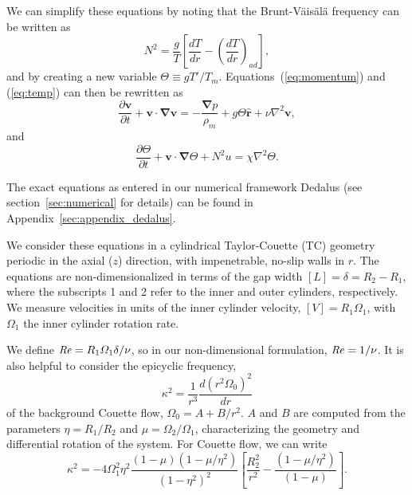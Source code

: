 \documentclass{jfm}
\begin{document}
We can simplify these equations by noting that the Brunt-V\"ais\"al\"a frequency can be written as
\begin{equation}
  \label{eq:brunt}
  N^2 = \frac{g}{T}\left[\frac{d T}{dr} - \left(\frac{d T}{dr}\right)_{ad}\right],
\end{equation}
and by creating a new variable $\Theta \equiv g T'/T_m$. Equations~(\ref{eq:momentum}) and (\ref{eq:temp}) can then be rewritten as 
\begin{equation}
  \label{eq:final_momentum}
  \frac{\partial \mathbf{v}}{\partial t} + \mathbf{v \cdot \nabla v} = -\frac{\mathbf{\nabla} p}{\rho_m} + g \Theta \mathbf{\hat{r}} + \nu \nabla^2 \mathbf{v},
\end{equation}
and
\begin{equation}
  \label{eq:final_temp}
  \frac{\partial \Theta}{\partial t} + \mathbf{v \cdot \nabla} \Theta + N^2 u = \chi \nabla^2 \Theta.
\end{equation}

The exact equations as entered in our numerical framework Dedalus (see
section~\ref{sec:numerical} for details) can be found in
Appendix~\ref{sec:appendix_dedalus}.

We consider these equations in a cylindrical Taylor-Couette (TC) geometry
periodic in the axial ($z$) direction, with impenetrable, no-slip
walls in $r$. The equations are non-dimensionalized in terms of the
gap width $[L] = \delta = R_2 -R_1$, where the subscripts 1 and 2
refer to the inner and outer cylinders, respectively. We measure
velocities in units of the inner cylinder velocity,
$[V] = R_1 \Omega_1$, with $\Omega_1$ the inner cylinder rotation
rate. 

We define $\mbox{\textit{Re}} = R_1 \varOmega_1 \delta/\nu$, so in our non-dimensional
formulation, $\mbox{\textit{Re}} = 1/\nu$. It is also helpful to consider the epicyclic frequency, 
\begin{equation}
  \label{eq:epicyclic_freq}
\kappa^2 = \frac{1}{r^3}\frac{d (r^2 \Omega_0)^2}{dr}
\end{equation}
of the background Couette flow, $\Omega_0 = A + B/r^2$. $A$ and $B$
are computed from the parameters $\eta = R_1/R_2$ and
$\mu = \Omega_2/\Omega_1$, characterizing the geometry and
differential rotation of the system. For Couette flow, we can write 
\begin{equation}
  \label{eq:kappa_couette}
  \kappa^2 = - 4 \Omega_1^2 \eta^2
  \frac{(1-\mu)(1-\mu/\eta^2)}{(1-\eta^2)^2}
  \left[\frac{R_2^2}{r^2} -\frac{(1-\mu/\eta^2)}{(1-\mu)} \right].
\end{equation}
\end{document}
